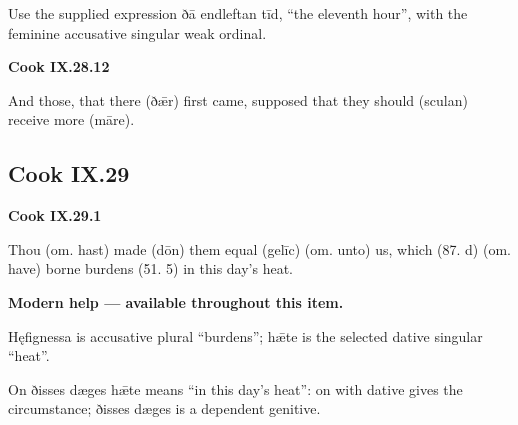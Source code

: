 Use the supplied expression ðā endleftan tīd, “the eleventh hour”, with the feminine accusative singular weak ordinal.

\par\begin{minipage}{\linewidth}\raggedright
\textbf{Cook IX.28.12}

And those, that there (ðǣr) first came, supposed that they should (sculan) receive more (māre).

\end{minipage}\par\addvspace{4pt}

\subsection*{Cook IX.29}

\par\begin{minipage}{\linewidth}\raggedright
\textbf{Cook IX.29.1}

Thou (om. hast) made (dōn) them equal (gelīc) (om. unto) us, which (87. d) (om. have) borne burdens (51. 5) in this day’s heat.

\textbf{Modern help — available throughout this item.}

\end{minipage}\par\addvspace{4pt}

Hęfignessa is accusative plural “burdens”; hǣte is the selected dative singular “heat”.

On ðisses dæges hǣte means “in this day’s heat”: on with dative gives the circumstance; ðisses dæges is a dependent genitive.

